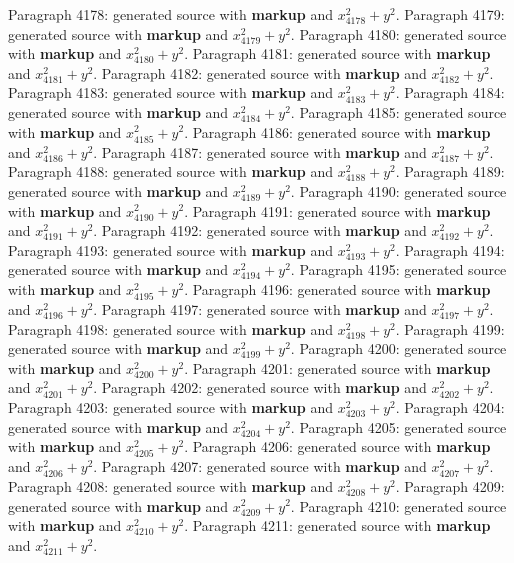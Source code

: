 \documentclass{article}
\begin{document}
Paragraph 4178: generated source with \textbf{markup} and $x_{4178}^2 + y^2$.
Paragraph 4179: generated source with \textbf{markup} and $x_{4179}^2 + y^2$.
Paragraph 4180: generated source with \textbf{markup} and $x_{4180}^2 + y^2$.
Paragraph 4181: generated source with \textbf{markup} and $x_{4181}^2 + y^2$.
Paragraph 4182: generated source with \textbf{markup} and $x_{4182}^2 + y^2$.
Paragraph 4183: generated source with \textbf{markup} and $x_{4183}^2 + y^2$.
Paragraph 4184: generated source with \textbf{markup} and $x_{4184}^2 + y^2$.
Paragraph 4185: generated source with \textbf{markup} and $x_{4185}^2 + y^2$.
Paragraph 4186: generated source with \textbf{markup} and $x_{4186}^2 + y^2$.
Paragraph 4187: generated source with \textbf{markup} and $x_{4187}^2 + y^2$.
Paragraph 4188: generated source with \textbf{markup} and $x_{4188}^2 + y^2$.
Paragraph 4189: generated source with \textbf{markup} and $x_{4189}^2 + y^2$.
Paragraph 4190: generated source with \textbf{markup} and $x_{4190}^2 + y^2$.
Paragraph 4191: generated source with \textbf{markup} and $x_{4191}^2 + y^2$.
Paragraph 4192: generated source with \textbf{markup} and $x_{4192}^2 + y^2$.
Paragraph 4193: generated source with \textbf{markup} and $x_{4193}^2 + y^2$.
Paragraph 4194: generated source with \textbf{markup} and $x_{4194}^2 + y^2$.
Paragraph 4195: generated source with \textbf{markup} and $x_{4195}^2 + y^2$.
Paragraph 4196: generated source with \textbf{markup} and $x_{4196}^2 + y^2$.
Paragraph 4197: generated source with \textbf{markup} and $x_{4197}^2 + y^2$.
Paragraph 4198: generated source with \textbf{markup} and $x_{4198}^2 + y^2$.
Paragraph 4199: generated source with \textbf{markup} and $x_{4199}^2 + y^2$.
Paragraph 4200: generated source with \textbf{markup} and $x_{4200}^2 + y^2$.
Paragraph 4201: generated source with \textbf{markup} and $x_{4201}^2 + y^2$.
Paragraph 4202: generated source with \textbf{markup} and $x_{4202}^2 + y^2$.
Paragraph 4203: generated source with \textbf{markup} and $x_{4203}^2 + y^2$.
Paragraph 4204: generated source with \textbf{markup} and $x_{4204}^2 + y^2$.
Paragraph 4205: generated source with \textbf{markup} and $x_{4205}^2 + y^2$.
Paragraph 4206: generated source with \textbf{markup} and $x_{4206}^2 + y^2$.
Paragraph 4207: generated source with \textbf{markup} and $x_{4207}^2 + y^2$.
Paragraph 4208: generated source with \textbf{markup} and $x_{4208}^2 + y^2$.
Paragraph 4209: generated source with \textbf{markup} and $x_{4209}^2 + y^2$.
Paragraph 4210: generated source with \textbf{markup} and $x_{4210}^2 + y^2$.
Paragraph 4211: generated source with \textbf{markup} and $x_{4211}^2 + y^2$.
\end{document}
